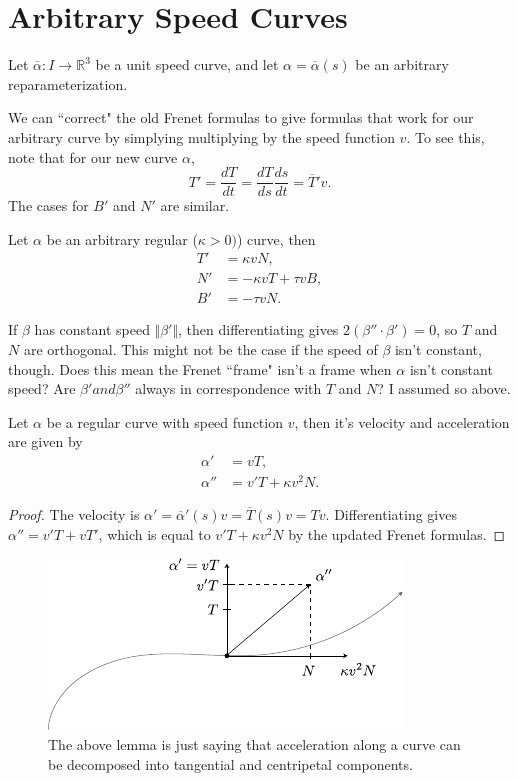 \documentclass[10pt]{report}
\begin{document}

\section{Arbitrary Speed Curves}

Let $\overline{\alpha} :I\to \mathbb{R}^3$ be a unit speed curve, and let $\alpha=\overline{\alpha}(s)$ be an arbitrary reparameterization. 

We can ``correct" the old Frenet formulas to give formulas that work for our arbitrary curve by simplying multiplying by the speed function $v$. To see this, note that for our new curve $\alpha$,
\[
T' = \frac{d T}{d t} = \frac{d T}{d s} \frac{d s}{d t} = \overline{T}'v.
\] 
The cases for $B'$ and $N'$ are similar.

\begin{thrm}[]
	Let $\alpha$ be an arbitrary regular ($\kappa>0)$) curve, then
\begin{align*}
	T' &= \kappa v N, \\
	N' &= -\kappa v T + \tau v B, \\
	B' &= -\tau v N.
\end{align*}
\end{thrm}

If $\beta$ has constant speed $\Vert{\beta'}\Vert$, then differentiating gives $2(\beta''\cdot \beta') = 0$, so $T$ and $N$ are orthogonal. This might not be the case if the speed of $\beta$ isn't constant, though. {\color{red}Does this mean the Frenet ``frame" isn't a frame when $\alpha$ isn't constant speed?} {\color{red}Are $\beta' and \beta''$ always in correspondence with $T$ and $N$? I assumed so above.}

\begin{lem}
	Let $\alpha$ be a regular curve with speed function $v$, then it's velocity and acceleration are given by
	\begin{align*}
		\alpha' &= vT, \\
		\alpha'' &= v'T + \kappa v^2 N.
	\end{align*}
\end{lem}
\begin{proof}
	The velocity is $\alpha' =\overline{\alpha}'(s)v = \overline{T}(s)v = Tv$. Differentiating gives $\alpha''=v'T + vT'$, which is equal to $v'T + \kappa v^2 N$ by the updated Frenet formulas.
\end{proof}

\begin{figure}[H]
	\centering
	\includegraphics[scale=1.5]{fig/frenet2.pdf}
	\caption{The above lemma is just saying that acceleration along a curve can be decomposed into tangential and centripetal components.}
\end{figure}
\end{document}
